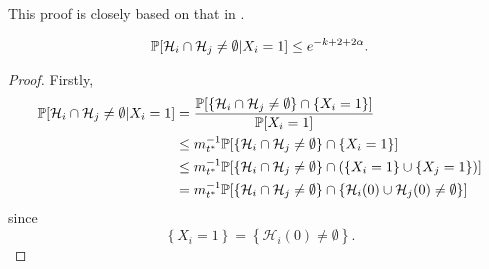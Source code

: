 This proof is closely based on that in \cite{Lubetzky2014-po}.
\begin{lemma}
	\label{lem: prob intersect given X_i = 1}
	\begin{equation}
		\mathbb{P}[\mathcal{H}_i \cap \mathcal{H}_j \neq \emptyset | X_i = 1] \leq e^{-k + 2 + 2\alpha}.
	\end{equation}
\end{lemma}
\begin{proof}
	Firstly,
	\begin{align}
		\mathbb{P}[\mathcal{H}_i \cap \mathcal{H}_j \neq \emptyset | X_i = 1] &= \frac{\mathbb{P}[\left\{\mathcal{H}_i \cap \mathcal{H}_j \neq \emptyset\right\} \cap \{X_i = 1\}]}{\mathbb{P}[X_i = 1]}\\
		&\leq m_{t^*}^{-1} \mathbb{P}[\left\{\mathcal{H}_i \cap \mathcal{H}_j \neq \emptyset\right\} \cap \{X_i = 1\}]\\
		&\leq  m_{t^*}^{-1} \mathbb{P}[\left\{\mathcal{H}_i \cap \mathcal{H}_j \neq \emptyset\right\} \cap \left(\{X_i = 1\} \cup \{X_j = 1\}\right)]\\
		&= m_{t^*}^{-1} \mathbb{P}[\left\{\mathcal{H}_i \cap \mathcal{H}_j \neq \emptyset\right\} \cap \left\{\mathcal{H}_i(0) \cup \mathcal{H}_j(0) \neq \emptyset\right\}]
	\end{align}
	since
	\begin{equation}
		\left\{X_i = 1\right\} = \left\{\mathcal{H}_i(0) \neq \emptyset\right\}.
	\end{equation}

\end{proof}
